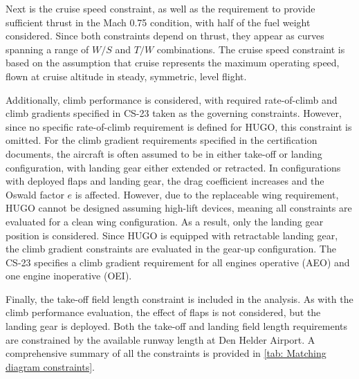 Next is the cruise speed constraint, as well as the requirement to provide sufficient thrust in the Mach 0.75 condition, with half of the fuel weight considered. Since both constraints depend on thrust, they appear as curves spanning a range of $W/S$ and $T/W$ combinations. The cruise speed constraint is based on the assumption that cruise represents the maximum operating speed, flown at cruise altitude in steady, symmetric, level flight.

Additionally, climb performance is considered, with required rate-of-climb and climb gradients specified in CS-23 taken as the governing constraints. However, since no specific rate-of-climb requirement is defined for HUGO, this constraint is omitted. For the climb gradient requirements specified in the certification documents, the aircraft is often assumed to be in either take-off or landing configuration, with landing gear either extended or retracted. In configurations with deployed flaps and landing gear, the drag coefficient increases and the Oswald factor $e$ is affected. However, due to the replaceable wing requirement, HUGO cannot be designed assuming high-lift devices, meaning all constraints are evaluated for a clean wing configuration. As a result, only the landing gear position is considered. Since HUGO is equipped with retractable landing gear, the climb gradient constraints are evaluated in the gear-up configuration. The CS-23 specifies a climb gradient requirement for all engines operative (AEO) and one engine inoperative (OEI).

Finally, the take-off field length constraint is included in the analysis. As with the climb performance evaluation, the effect of flaps is not considered, but the landing gear is deployed. Both the take-off and landing field length requirements are constrained by the available runway length at Den Helder Airport. A comprehensive summary of all the constraints is provided in \autoref{tab: Matching diagram constraints}.

